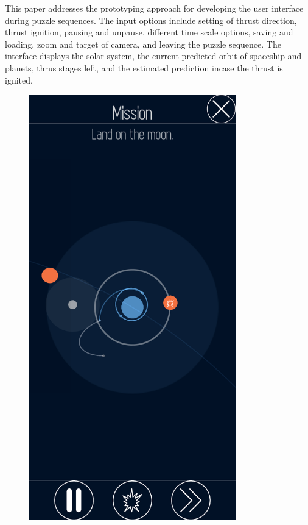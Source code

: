 \documentclass[runningheads]{llncs}
\begin{document}
This paper addresses the prototyping approach for developing the user interface during puzzle sequences.
The input options include setting of thrust direction, thrust ignition, pausing and unpause, different 
time scale options, saving and loading, zoom and target of camera, and leaving the puzzle sequence.
The interface displays the solar system, the current predicted orbit of spaceship and planets, thrus stages left, and the 
estimated prediction incase the thrust is ignited.

\begin{figure}[!htb]
  \centering
  \begin{minipage}{.5\textwidth}
      \centering
      \includegraphics[width=0.8\textwidth]{Prototype1.png}

\end{minipage}
\end{figure}
\end{document}
